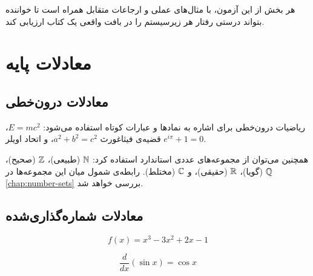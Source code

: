 \documentclass{matinbook}
\begin{document}
هر بخش از این آزمون، با مثال‌های عملی و ارجاعات متقابل
همراه است تا خواننده بتواند درستی رفتار هر زیرسیستم را
در بافت واقعی یک کتاب ارزیابی کند.

\clearpage

\tableofcontents
\clearpage

\listoffigures
\clearpage

\listoftables
\clearpage

\mainmatter
\mainmattergeometry

\chapter{معادلات پایه}
\label{chap:equations}

\section{معادلات درون‌خطی}
\label{sec:equations-inline}

ریاضیات درون‌خطی برای اشاره به نمادها و عبارات کوتاه استفاده
می‌شود: $E = mc^{2}$، قضیه‌ی فیثاغورث $a^{2} + b^{2} = c^{2}$،
و اتحاد اویلر $e^{i\pi} + 1 = 0$.

همچنین می‌توان از مجموعه‌های عددی استاندارد استفاده کرد:
$\mathbb{N}$ (طبیعی)، $\mathbb{Z}$ (صحیح)، $\mathbb{Q}$ (گویا)، $\mathbb{R}$ (حقیقی)،
و $\mathbb{C}$ (مختلط). رابطه‌ی شمول میان این مجموعه‌ها در
\cref{chap:number-sets} بررسی خواهد شد.


\section{معادلات شماره‌گذاری‌شده}
\label{sec:equations-numbered}

\begin{equation}
    f(x) = x^{3} - 3x^{2} + 2x - 1
    \label{eq:cubic}
\end{equation}

\begin{equation}
    \frac{d}{dx}\left( \sin x \right) = \cos x
    \label{eq:derivative-sin}
\end{equation}
\end{document}
